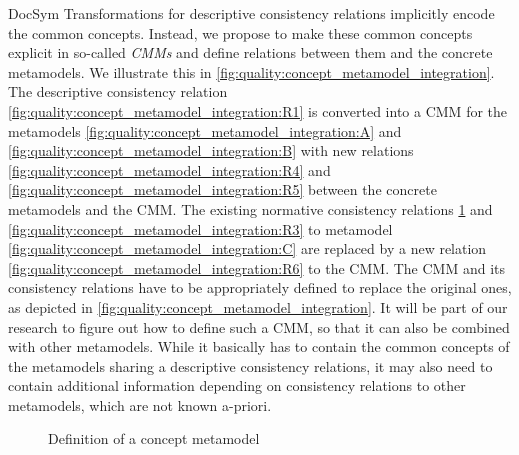 \begin{copiedFrom}{DocSym}
Transformations for descriptive consistency relations implicitly encode %
the common concepts.
Instead, we propose to make these common concepts explicit in so-called \emph{\acfp{CMM}} and define relations between them and the concrete metamodels.
We illustrate this in \autoref{fig:quality:concept_metamodel_integration}.
The descriptive consistency relation \ref{fig:quality:concept_metamodel_integration:R1} is converted into a \ac{CMM} for the metamodels \ref{fig:quality:concept_metamodel_integration:A} and \ref{fig:quality:concept_metamodel_integration:B} with new relations \ref{fig:quality:concept_metamodel_integration:R4} and \ref{fig:quality:concept_metamodel_integration:R5} between the concrete metamodels and the \ac{CMM}.
The existing normative consistency relations \ref{fig:quality:concept_metamodel_integration} and \ref{fig:quality:concept_metamodel_integration:R3} to metamodel \ref{fig:quality:concept_metamodel_integration:C} are replaced by a new relation \ref{fig:quality:concept_metamodel_integration:R6} to the \ac{CMM}. %
The \ac{CMM} and its consistency relations have to be appropriately defined to replace the original ones, as depicted in \autoref{fig:quality:concept_metamodel_integration}. %
It will be part of our research to figure out how to define such a \ac{CMM}, so that it can also be combined with other metamodels. %
While it basically has to contain the common concepts of the metamodels sharing a descriptive consistency relations, it may also need to contain additional information depending on consistency relations to other metamodels, which are not known a-priori.

\begin{figure}
    \centering
    
    \caption{Definition of a concept metamodel}
    \label{fig:quality:concept_metamodel_integration}
\end{figure}


\end{copiedFrom}
